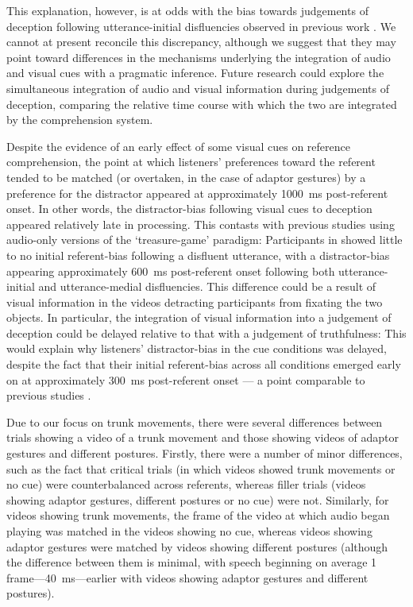 \documentclass[a4paper,man,natbib]{apa6}
\begin{document}
This explanation, however, is at odds with the bias towards judgements of deception following utterance-initial disfluencies observed in previous work \citetext{\citet{Loy2017}, Experiment~1}.
We cannot at present reconcile this discrepancy, although we suggest that they may point toward differences in the mechanisms underlying the integration of audio and visual cues with a pragmatic inference.
Future research could explore the simultaneous integration of audio and visual information during judgements of deception, comparing the relative time course with which the two are integrated by the comprehension system.

Despite the evidence of an early effect of some visual cues on reference comprehension, the point at which listeners' preferences toward the referent tended to be matched (or overtaken, in the case of adaptor gestures) by a preference for the distractor appeared at approximately 1000~ms post-referent onset. 
In other words, the distractor-bias following visual cues to deception appeared relatively late in processing.
This contasts with previous studies using audio-only versions of the `treasure-game' paradigm: Participants in \citet{Loy2017} showed little to no initial referent-bias following a disfluent utterance, with a distractor-bias appearing approximately 600~ms post-referent onset following both utterance-initial and utterance-medial disfluencies. 
This difference could be a result of visual information in the videos detracting participants from fixating the two objects. 
In particular, the integration of visual information into a judgement of deception could be delayed relative to that with a judgement of truthfulness: 
This would explain why listeners' distractor-bias in the cue conditions was delayed, despite the fact that their initial referent-bias across all conditions emerged early on at approximately 300~ms post-referent onset --- a point comparable to previous studies \citep{Loy2017, King2018}. 

Due to our focus on trunk movements, there were several differences between trials showing a video of a trunk movement and those showing videos of adaptor gestures and different postures.
Firstly, there were a number of minor differences, such as the fact that critical trials (in which videos showed trunk movements or no cue) were counterbalanced across referents, whereas filler trials (videos showing adaptor gestures, different postures or no cue) were not.
Similarly, for videos showing trunk movements, the frame of the video at which audio began playing was matched in the videos showing no cue, whereas videos showing adaptor gestures were matched by videos showing different postures (although the difference between them is minimal, with speech beginning on average 1 frame---40~ms---earlier with videos showing adaptor gestures and different postures).
\end{document}
